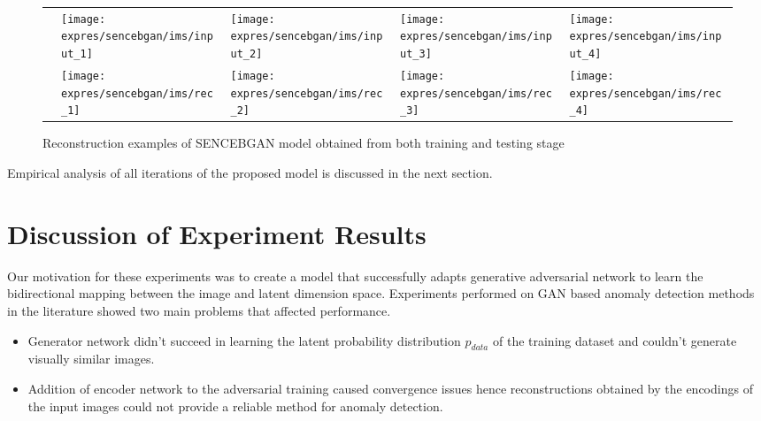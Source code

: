 \begin{figure}[!h]	
	\setlength\tabcolsep{1pt}
	\settowidth{}
	\begin{tabularx}{\linewidth}{l XXXX}
		\rothead{Image Samples}  & \texttt{[image: expres/sencebgan/ims/input\_1]}
		& \texttt{[image: expres/sencebgan/ims/input\_2]}
		& \texttt{[image: expres/sencebgan/ims/input\_3]}
		& \texttt{[image: expres/sencebgan/ims/input\_4]} \\
		\rothead{Reconstructions} & \texttt{[image: expres/sencebgan/ims/rec\_1]}
		& \texttt{[image: expres/sencebgan/ims/rec\_2]} 
		& \texttt{[image: expres/sencebgan/ims/rec\_3]} 
		&\texttt{[image: expres/sencebgan/ims/rec\_4]}
	\end{tabularx}
	\caption{Reconstruction examples of SENCEBGAN model obtained from both training and testing stage}\label{fig:sencebgan_reconstruction}
\end{figure}

Empirical analysis of all iterations of the proposed model is discussed in the next section.

\section{Discussion of Experiment Results}
\label{sec:exp_discuss}

Our motivation for these experiments was to create a model that successfully adapts generative adversarial network to learn the 
bidirectional mapping between the image and latent dimension space. Experiments performed on GAN based anomaly detection methods 
in the literature showed two main problems that affected performance. 

\begin{itemize}
	\item {Generator network didn't succeed in learning the latent probability distribution $p_{data}$ of the training dataset and 
	couldn't generate visually similar images.}
	\item {Addition of encoder network to the adversarial training caused convergence issues hence reconstructions obtained by the 
	encodings of the input images could not provide a reliable method for anomaly detection.}
\end{itemize}

